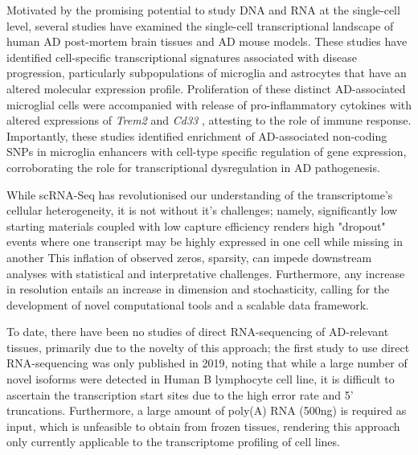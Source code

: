 Motivated by the promising potential to study DNA and RNA at the single-cell level, several studies have examined the single-cell transcriptional landscape of human AD post-mortem brain tissues\cite{Mathys2019,Nott2019,Thrupp2020,Olah2020,Leng2021,Young2021} and AD mouse models\cite{Keren-Shaul2017,Mathys2017}. These studies have identified cell-specific transcriptional signatures associated with disease progression, particularly subpopulations of microglia and astrocytes that have an altered molecular expression profile. Proliferation of these distinct AD-associated microglial cells were accompanied with release of pro-inflammatory cytokines\cite{Mathys2017} with altered expressions of \textit{Trem2} and \textit{Cd33} \cite{Mathys2019,Frigerio2019}, attesting to the role of immune response. Importantly, these studies identified enrichment of AD-associated non-coding SNPs in microglia enhancers with cell-type specific regulation of gene expression\cite{Tansey2018,Nott2019,Young2021,Novikova2021}, corroborating the role for transcriptional dysregulation in AD pathogenesis.   

While scRNA-Seq has revolutionised our understanding of the transcriptome's cellular heterogeneity, it is not without it's challenges; namely, significantly low starting materials coupled with low capture efficiency renders high "dropout" events where one transcript may be highly expressed in one cell while missing in another\cite{Lahnemann2020,Adil2021} This inflation of observed zeros, sparsity, can impede downstream analyses with statistical and interpretative challenges\cite{Adil2021}. Furthermore, any increase in resolution entails an increase in dimension and stochasticity, calling for the development of novel computational tools and a scalable data framework\cite{Lahnemann2020}. 


To date, there have been no studies of direct RNA-sequencing of AD-relevant tissues, primarily due to the novelty of this approach; the first study to use direct RNA-sequencing was only published in 2019, noting that while a large number of novel isoforms were detected in Human B lymphocyte cell line, it is difficult to ascertain the transcription start sites due to the high error rate and 5' truncations\cite{Workman2019a}. Furthermore, a large amount of poly(A) RNA (500ng) is required as input, which is unfeasible to obtain from frozen tissues, rendering this approach only currently applicable to the transcriptome profiling of cell lines.      
  

